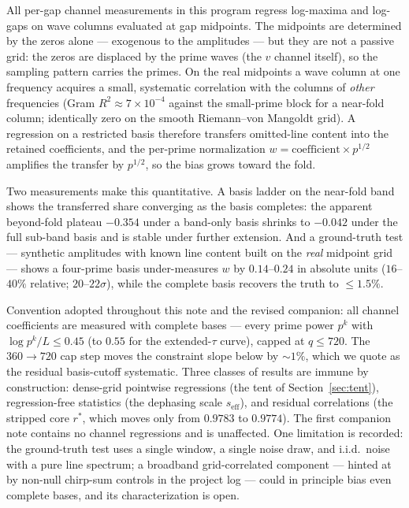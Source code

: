 \documentclass[12pt]{amsart}
\begin{document}
All per-gap channel measurements in this program regress log-maxima and
log-gaps on wave columns evaluated at gap midpoints. The midpoints are
determined by the zeros alone --- exogenous to the amplitudes --- but
they are not a passive grid: the zeros are displaced by the prime waves
(the $v$ channel itself), so the sampling pattern carries the primes. On
the real midpoints a wave column at one frequency acquires a small,
systematic correlation with the columns of \emph{other} frequencies
(Gram $R^2 \approx 7\times10^{-4}$ against the small-prime block for a
near-fold column; identically zero on the smooth Riemann--von Mangoldt
grid). A regression on a restricted basis therefore transfers
omitted-line content into the retained coefficients, and the per-prime
normalization $w = \text{coefficient} \times p^{1/2}$ amplifies the
transfer by $p^{1/2}$, so the bias grows toward the fold.

Two measurements make this quantitative. A basis ladder on the near-fold
band shows the transferred share converging as the basis completes: the
apparent beyond-fold plateau $-0.354$ under a band-only basis shrinks to
$-0.042$ under the full sub-band basis and is stable under further
extension. And a ground-truth test --- synthetic amplitudes with known
line content built on the \emph{real} midpoint grid --- shows a
four-prime basis under-measures $w$ by $0.14$--$0.24$ in absolute units
($16$--$40\%$ relative; $20$--$22\sigma$), while the complete basis
recovers the truth to $\le 1.5\%$.

Convention adopted throughout this note and the revised companion: all
channel coefficients are measured with complete bases --- every prime
power $p^k$ with $\log p^k / L \le 0.45$ (to $0.55$ for the
extended-$\tau$ curve), capped at $q \le 720$. The $360 \to 720$ cap
step moves the constraint slope below by $\sim 1\%$, which we quote as
the residual basis-cutoff systematic. Three classes of results are
immune by construction: dense-grid pointwise regressions (the tent of
Section~\ref{sec:tent}), regression-free statistics (the dephasing
scale $s_{\mathrm{eff}}$), and residual correlations (the stripped core
$r^*$, which moves only from $0.9783$ to $0.9774$). The first companion
note contains no channel regressions and is unaffected. One limitation
is recorded: the ground-truth test uses a single window, a single noise
draw, and i.i.d.\ noise with a pure line spectrum; a broadband
grid-correlated component --- hinted at by non-null chirp-sum controls
in the project log --- could in principle bias even complete bases, and
its characterization is open.
\end{document}
